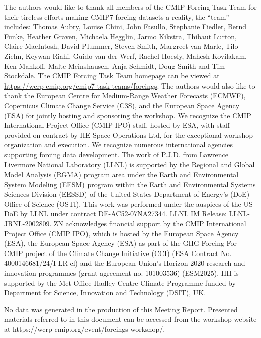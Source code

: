 \documentclass{ametsocV6.1}
\begin{document}
\clearpage
\acknowledgments
The authors would like to thank all members of the CMIP Forcing Task Team for their tireless efforts making CMIP7 forcing datasets a reality, the ``team'' includes: Thomas Aubry, Louise Chini, John Fasullo, Stephanie Fiedler, Bernd Funke, Heather Graven, Michaela Hegglin, Jarmo Kikstra, Thibaut Lurton, Claire MacIntosh, David Plummer, Steven Smith, Margreet van Marle, Tilo Ziehn, Keywan Riahi, Guido van der Werf, Rachel Hoesly, Mahesh Kovilakam, Ken Mankoff, Malte Meinshausen, Anja Schmidt, Doug Smith and Tim Stockdale. The CMIP Forcing Task Team homepage can be viewed at \url{https://wcrp-cmip.org/cmip7-task-teams/forcings}. The authors would also like to thank the European Centre for Medium-Range Weather Forecasts (ECMWF), Copernicus Climate Change Service (C3S), and the European Space Agency (ESA) for jointly hosting and sponsoring the workshop. We recognize the CMIP International Project Office (CMIP-IPO) staff, hosted by ESA, with staff provided on contract by HE Space Operations Ltd, for the exceptional workshop organization and execution. We recognize numerous international agencies supporting forcing data development. The work of P.J.D. from Lawrence Livermore National Laboratory (LLNL) is supported by the Regional and Global Model Analysis (RGMA) program area under the Earth and Environmental System Modeling (EESM) program within the Earth and Environmental Systems Sciences Division (EESSD) of the United States Department of Energy’s (DoE) Office of Science (OSTI). This work was performed under the auspices of the US DoE by LLNL under contract DE-AC52-07NA27344. LLNL IM Release: LLNL-JRNL-2002809. ZN acknowledges financial support by the CMIP International Project Office (CMIP IPO), which is hosted by the European Space Agency (ESA), the European Space Agency (ESA) as part of the GHG Forcing For CMIP project of the Climate Change Initiative (CCI) (ESA Contract No. 4000146681/24/I-LR-cl) and the European Union's Horizon 2020 research and innovation programmes (grant agreement no. 101003536) (ESM2025). HH is supported by the Met Office Hadley Centre Climate Programme funded by Department for Science, Innovation and Technology (DSIT), UK.


% 
%
\datastatement
No data was generated in the production of this Meeting Report. Presented materials referred to in this document can be accessed from the workshop website at https://wcrp-cmip.org/event/forcings-workshop/.




\end{document}
